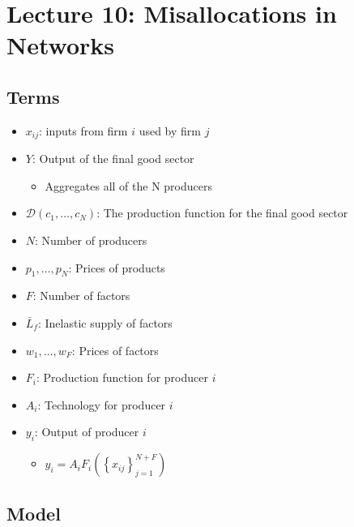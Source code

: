 \documentclass[10pt]{article}
\begin{document}

\section{Lecture 10: Misallocations in Networks}

\subsection{Terms}

\begin{itemize}
    \item $x_{ij}$: inputs from firm $i$ used by firm $j$
    \item $Y$: Output of the final good sector
        \begin{itemize}
            \item Aggregates all of the N producers
        \end{itemize}
    \item $\mathcal{D}\left(c_1, \ldots, c_N\right)$: The production function for the final good sector
    \item $N$: Number of producers
    \item $p_1, \ldots, p_N$: Prices of products
    \item $F$: Number of factors
    \item $\bar{L}_f$: Inelastic supply of factors
    \item $w_1, \ldots, w_F$: Prices of factors
    \item $F_i$: Production function for producer $i$
    \item $A_i$: Technology for producer $i$
    \item $y_i$: Output of producer $i$
        \begin{itemize}
            \item $y_i=A_i F_i\left(\left\{x_{i j}\right\}_{j=1}^{N+F}\right)$
        \end{itemize}
\end{itemize}

\subsection{Model}
\end{document}
